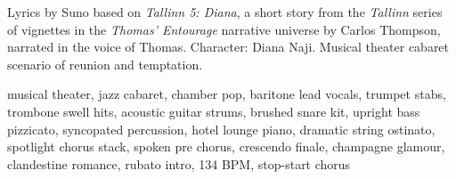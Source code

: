 

\begin{notes}
Lyrics by Suno based on \emph{Tallinn 5: Diana}, a short story from the \emph{Tallinn} series of vignettes in the \emph{Thomas’ Entourage} narrative universe by Carlos Thompson, narrated in the voice of Thomas. Character: Diana Naji. Musical theater cabaret scenario of reunion and temptation.
\end{notes}

\begin{style}
musical theater, jazz cabaret, chamber pop, baritone lead vocals, trumpet stabs, trombone swell hits, acoustic guitar strums, brushed snare kit, upright bass pizzicato, syncopated percussion, hotel lounge piano, dramatic string ostinato, spotlight chorus stack, spoken pre chorus, crescendo finale, champagne glamour, clandestine romance, rubato intro, 134 BPM, stop-start chorus
\end{style}

